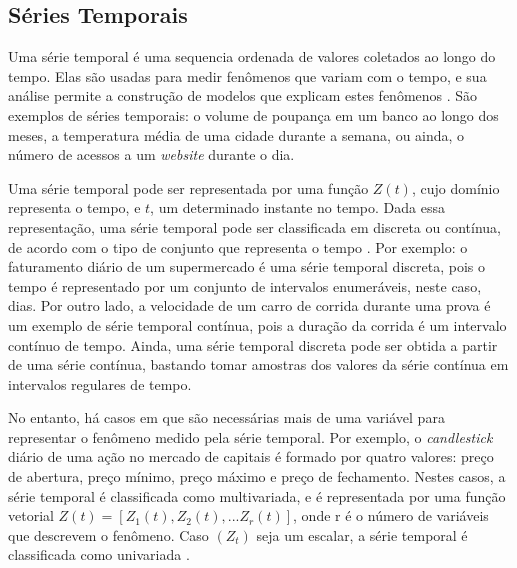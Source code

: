 \subsection{Séries Temporais}
	\label{subsec:series_temporais}

Uma série temporal é uma sequencia ordenada de valores coletados ao longo do
tempo. Elas são usadas para medir fenômenos que variam com o tempo, e sua
análise permite a construção de modelos que explicam estes fenômenos
\cite{morettin2006analise}. São exemplos de séries temporais: o volume de
poupança em um banco ao longo dos meses, a temperatura média de uma cidade
durante a semana, ou ainda, o número de acessos a um \textit{website} durante o dia.

Uma série temporal pode ser representada por uma função $Z(t)$, cujo domínio
representa o tempo, e $t$, um determinado instante no tempo. Dada essa
representação, uma série temporal pode ser classificada em discreta ou contínua,
de acordo com o tipo de conjunto que representa o tempo
\cite{morettin2006analise}. Por exemplo: o faturamento diário de um supermercado
é uma série temporal discreta, pois o tempo é representado por um conjunto de
intervalos enumeráveis, neste caso, dias. Por outro lado, a velocidade de um
carro de corrida durante uma prova é um exemplo de série temporal contínua, pois
a duração da corrida é um intervalo contínuo de tempo. Ainda, uma série temporal
discreta pode ser obtida a partir de uma série contínua, bastando tomar amostras
dos valores da série contínua em intervalos regulares de tempo.

No entanto, há casos em que são necessárias mais de uma variável para
representar o fenômeno medido pela série temporal. Por exemplo, o
\emph{candlestick} diário de uma ação no mercado de capitais é formado por
quatro valores: preço de abertura, preço mínimo, preço máximo e preço de
fechamento. Nestes casos, a série temporal é classificada como multivariada, e é
representada por uma função vetorial
$Z\left(t\right) =
	\left[
		Z_1\left(t\right),
		Z_2\left(t\right),
		...
		Z_r\left(t\right)
	\right]$,
onde r é o número de variáveis que descrevem o fenômeno. Caso $\left(Z_t\right)$
seja um escalar, a série temporal é classificada como univariada
\cite{morettin2006analise}.